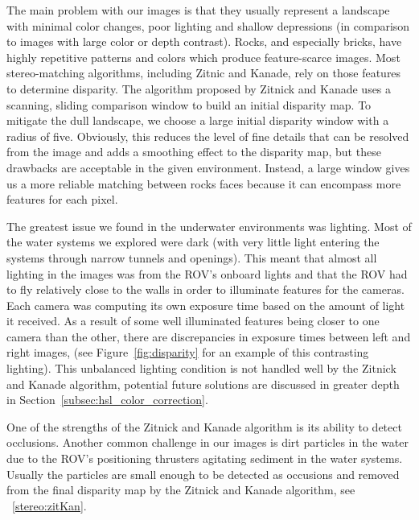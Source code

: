 \documentclass[a4paper,twoside]{article}
\begin{document}
The main problem with our images is that they usually represent a landscape with minimal color changes, poor lighting and shallow depressions (in comparison to images with large color or depth contrast).  
Rocks, and especially bricks, have highly repetitive patterns and colors which produce feature-scarce images.
Most stereo-matching algorithms, including Zitnic and Kanade, rely on those features to determine disparity.  
The algorithm proposed by Zitnick and Kanade uses a scanning, sliding comparison window to build an initial disparity map.  
To mitigate the dull landscape, we choose a large initial disparity window with a radius of five. 
Obviously, this reduces the level of fine details that can be resolved from the image and adds a smoothing effect to the disparity map, but these drawbacks are acceptable in the given environment.  
Instead, a large window gives us a more reliable matching between rocks faces because it can encompass more features for each pixel.  

The greatest issue we found in the underwater environments was lighting.  Most of the water systems we explored were dark (with very little light entering the systems through narrow tunnels and openings).  This meant that almost all lighting in the images was from the ROV's onboard lights and that the ROV had to fly relatively close to the walls in order to illuminate features for the cameras.
Each camera was computing its own exposure time based on the amount of light it received.  
As a result of some well illuminated features being closer to one camera than the other, there are discrepancies in exposure times between left and right images, (see Figure~\ref{fig:disparity} for an example of this contrasting lighting).
  This unbalanced lighting condition is not handled well by the Zitnick and Kanade algorithm, potential future solutions are discussed in greater depth in Section~\ref{subsec:hsl_color_correction}.

One of the strengths of the Zitnick and Kanade algorithm is its ability to detect occlusions.  
Another common challenge in our images is dirt particles in the water due to the ROV's positioning thrusters agitating sediment in the water systems. Usually the particles are small enough to be detected as occusions and removed from the final disparity map by the Zitnick and Kanade algorithm, see ~\ref{stereo:zitKan}.
\end{document}
